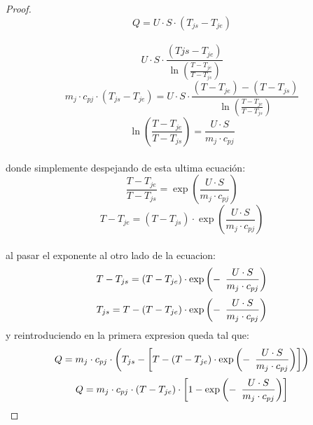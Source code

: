 \documentclass{report}
\begin{document}
\begin{proof}
	\begin{equation*}
		 Q = U\cdot S \cdot (T_{js}-T_{je})
	\end{equation*}\\
	\begin{equation*}
		U \cdot S \cdot \frac{(T{js}-T_{je})}{\ln\left(\frac{T-T_{je}}{T-T_{js}}\right)}
   \end{equation*}
\vspace{0.1cm}
	\begin{equation*}
		m_j \cdot c_{pj} \cdot (T_{js}-T_{je}) = U \cdot S \cdot \frac{(T-T_{je})-(T-T_{js})}{\ln\left(\frac{T-T_{je}}{T-T_{js}}\right)}
	\end{equation*}
	\begin{equation*}
		\ln \left(\frac{T-T_{je}}{T-T_{js}}\right) = \frac{U \cdot S }{m_j \cdot c_{pj}} 
	\end{equation*}\\

	\noindent donde simplemente despejando  de esta ultima ecuación:
	\begin{equation*}
		\frac{T-T_{je}}{T-T_{js}} = \exp\left(\frac{U \cdot S }{m_j \cdot c_{pj}}\right)
	\end{equation*}
	\begin{equation*}
		T - T_{je} = (T-T_{js}) \cdot \exp\left(\frac{U \cdot S }{m_j \cdot c_{pj}}\right) 
	\end{equation*}\\
	al pasar el exponente al otro lado de la ecuacion:\\
	\begin{equation*}
		T-T_{js} = (T - T_{je}) \cdot \exp\left(- \hspace{0.5em}\frac{U \cdot S }{m_j \cdot c_{pj}}\right) 
	\end{equation*}
	\begin{equation*}
		T_{js} = T- (T - T_{je}) \cdot \exp\left(- \hspace{0.5em}\frac{U \cdot S }{m_j \cdot c_{pj}}\right) 
	\end{equation*}
	\noindent y reintroduciendo en la primera expresion queda tal que:
	\begin{equation*}
		Q = m_j \cdot c_{pj} \cdot \left(T_{js} - \left[ T - (T - T_{je}) \cdot \exp\left(- \hspace{0.5em}\frac{U \cdot S }{m_j \cdot c_{pj}}\right) \right] \right)
	\end{equation*}
	\begin{equation*}
		Q = m_j \cdot c_{pj} \cdot (T - T_{je}) \cdot \left[1 - \exp\left(-\hspace{0.5em} \frac{U \cdot S}{m_j \cdot c_{pj}}\right)\right]
	\end{equation*}
\end{proof}
\newpage
\end{document}
